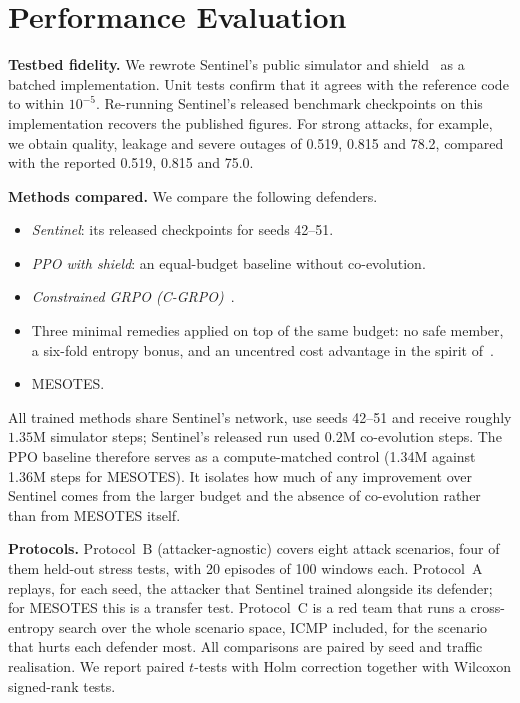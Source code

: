 \documentclass[conference]{IEEEtran}
\begin{document}
\section{Performance Evaluation}
\label{sec:eval}
\textbf{Testbed fidelity.} We rewrote Sentinel's public simulator and shield~\cite{sentinelcode} as a batched implementation. Unit tests confirm that it agrees with the reference code to within $10^{-5}$. Re-running Sentinel's released benchmark checkpoints on this implementation recovers the published figures. For strong attacks, for example, we obtain quality, leakage and severe outages of 0.519, 0.815 and 78.2, compared with the reported 0.519, 0.815 and 75.0.

\textbf{Methods compared.} We compare the following defenders.
\begin{itemize}
\item \emph{Sentinel}: its released checkpoints for seeds 42--51.
\item \emph{PPO with shield}: an equal-budget baseline without co-evolution.
\item \emph{Constrained GRPO (C-GRPO)}~\cite{girgis2026cgrpo}.
\item Three minimal remedies applied on top of the same budget: no safe member, a six-fold entropy bonus, and an uncentred cost advantage in the spirit of~\cite{nie2026starvation}.
\item MESOTES.
\end{itemize}
All trained methods share Sentinel's network, use seeds 42--51 and receive roughly $1.35$M simulator steps; Sentinel's released run used $0.2$M co-evolution steps. The PPO baseline therefore serves as a compute-matched control (1.34M against 1.36M steps for MESOTES). It isolates how much of any improvement over Sentinel comes from the larger budget and the absence of co-evolution rather than from MESOTES itself.

\textbf{Protocols.} Protocol~B (attacker-agnostic) covers eight attack scenarios, four of them held-out stress tests, with 20 episodes of 100 windows each. Protocol~A replays, for each seed, the attacker that Sentinel trained alongside its defender; for MESOTES this is a transfer test. Protocol~C is a red team that runs a cross-entropy search over the whole scenario space, ICMP included, for the scenario that hurts each defender most. All comparisons are paired by seed and traffic realisation. We report paired $t$-tests with Holm correction together with Wilcoxon signed-rank tests.
\end{document}
